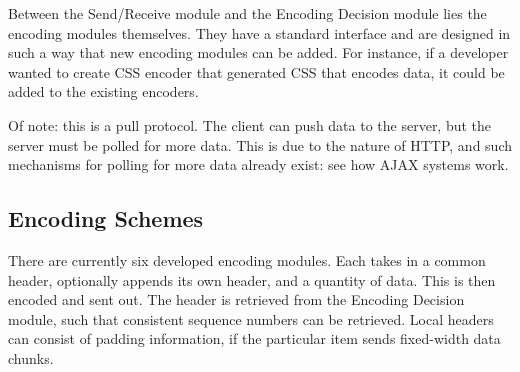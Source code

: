 Between the Send/Receive module and the Encoding Decision module lies the encoding modules themselves. They have a standard interface and are designed in such a way that new encoding modules can be added. For instance, if a developer wanted to create CSS encoder that generated CSS that encodes data, it could be added to the existing encoders.

Of note: this is a pull protocol. The client can push data to the server, but the server must be polled for more data. This is due to the nature of HTTP, and such mechanisms for polling for more data already exist: see how AJAX systems work.

\subsection{Encoding Schemes}
There are currently six developed encoding modules. Each takes in a common header, optionally appends its own header, and a quantity of data. This is then encoded and sent out. The header is retrieved from the Encoding Decision module, such that consistent sequence numbers can be retrieved. Local headers can consist of padding information, if the particular item sends fixed-width data chunks. 

